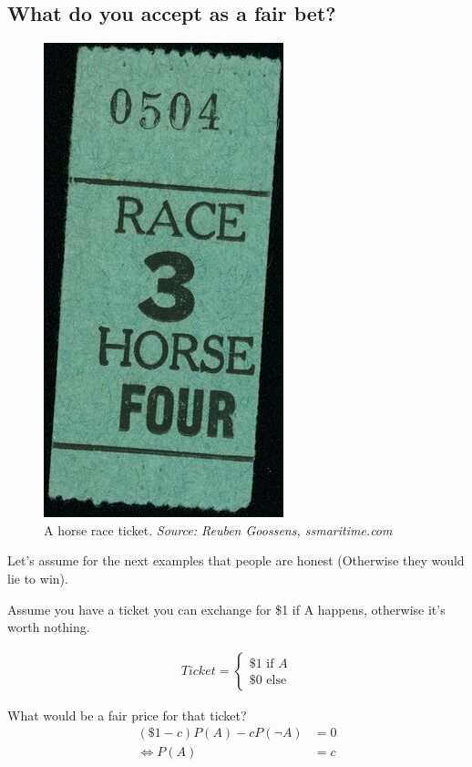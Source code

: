 \subsection{What do you accept as a fair bet?}
\begin{figure}[ht]
  \begin{center}
    \includegraphics[]{images/Oronsay-Rick-Danley-Horse-Race-ticket-June-30.jpg}
    \caption{A horse race ticket. \textit{Source: Reuben Goossens, ssmaritime.com}}
    \label{fig:raceticket}
  \end{center}
\end{figure}

Let's assume for the next examples that people are honest (Otherwise they would lie to win).

Assume you have a ticket you can exchange for \$1 if A happens, otherwise it's worth nothing.

\begin{align*}
Ticket = 
  \begin{cases}
    \$1 \mbox{ if } A \\
    \$0 \mbox{ else}
  \end{cases}
\end{align*}

What would be a fair price for that ticket?
\begin{align*}
\left(\$1 - c\right) P(A) - cP(\neg A) &= 0 \\
\Leftrightarrow P(A) &= c
\end{align*}

